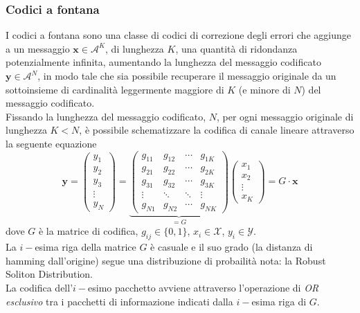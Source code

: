 \documentclass[italian, a4paper, 12pt]{article}
\begin{document}
\subsubsection{Codici a fontana}\label{FCsection}
I codici a fontana sono una classe di codici di correzione degli errori che aggiunge a un messaggio $\bm{x}\in\mathcal{A}^K$, di lunghezza $K$, una quantità di ridondanza potenzialmente infinita, aumentando la lunghezza del messaggio codificato $\bm{y}\in\mathcal{A}^N$, in modo tale che sia possibile recuperare il messaggio originale da un sottoinsieme di cardinalità leggermente maggiore di $K$ (e minore di $N$) del messaggio codificato.\\
Fissando la lunghezza del messaggio codificato, $N$, per ogni messaggio originale di lunghezza $K<N$, è possibile schematizzare la codifica di canale lineare attraverso la seguente equazione
\begin{equation}
\bm{y} =
\begin{pmatrix}
y_1 \\y_2 \\y_3 \\\vdots \\y_N
\end{pmatrix} = \underbrace{\begin{pmatrix}
g_{11}	&g_{12}	&\cdots	&g_{1K}\\
g_{21}	&g_{22}	&\cdots	&g_{2K}\\
g_{31}	&g_{32}	&\cdots	&g_{3K}\\
\vdots &\ddots & \ddots &\vdots\\
g_{N1}	&g_{N2}	&\cdots	&g_{NK}
\end{pmatrix}}_{=G} \begin{pmatrix}
x_1 \\x_2 \\\vdots \\x_K
\end{pmatrix} = G \cdot \bm{x}
\end{equation}
dove $G$ è la matrice di codifica, $g_{ij}\in\{0,1\}$, $x_i\in\mathcal{X}$, $y_i\in\mathcal{Y}$.\\
La $i-$esima riga della matrice $G$ è casuale e il suo grado (la distanza di hamming dall'origine) segue una distribuzione di probailità nota: la Robust Soliton Distribution.\\
La codifica dell'$i-$esimo pacchetto avviene attraverso l'operazione di \textit{OR esclusivo} tra i pacchetti di informazione indicati dalla $i-$esima riga di $G$.\\
\end{document}
